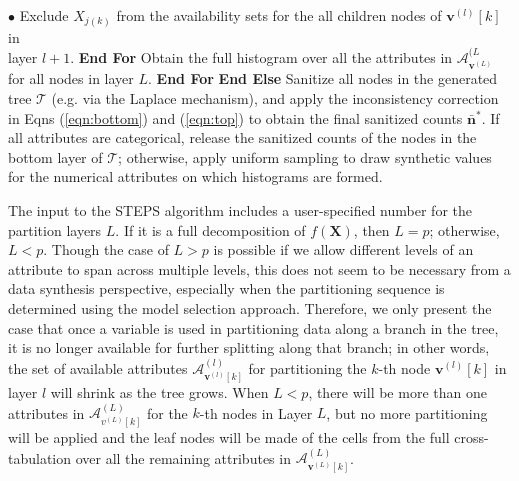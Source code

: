 \documentclass[12pt, A4]{article}
\newcommand{\vv}{\mathbf{v}}
\theoremstyle{plain}
\theoremstyle{exampstyle}\newtheorem{defn}{Definition}
\theoremstyle{exampstyle}\newtheorem{lem}{Lemma}
\theoremstyle{exampstyle}\newtheorem{cor}{Corollary}
\theoremstyle{exampstyle}\newtheorem{pro}{Proposition}
\theoremstyle{exampstyle}\newtheorem{cla}{Claim}
\theoremstyle{exampstyle}\newtheorem{rem}{Remark}
\begin{document}
\begin{algorithm}[!tbh]
\begin{algorithmic}[1]
\State \hspace{26 pt}$\bullet$ Exclude $X_{j(k)}$ from the availability sets for the all children nodes of $\vv^{(l)}[k]$ in \\  \hspace{30 pt} layer  $l+1$.
\State \hspace{20 pt} \textbf{End For}
\State \hspace{10 pt} Obtain the full histogram over all the attributes in $\mathcal{A}^{(L}_{\vv^{(L)}}$ for all nodes in layer $L$.
\State \hspace{10 pt} \textbf{End For}
\State \textbf{End Else}
\State  Sanitize all nodes in the generated tree $\mathcal{T}$ (e.g. via the Laplace mechanism), and apply the inconsistency correction in Eqns (\ref{eqn:bottom}) and (\ref{eqn:top}) to obtain the final sanitized counts $\bar{\mathbf{n}}^*$. 
\State  If all attributes are categorical, release the sanitized counts of the nodes in the bottom layer of $\mathcal{T}$; otherwise, apply  uniform sampling to draw synthetic values for the numerical attributes on which histograms are formed.
\end{algorithmic}
\end{algorithm}
The input to the STEPS algorithm includes a user-specified number for the partition layers $L$. If it is a full decomposition of $f(\mathbf{X})$, then $L=p$; otherwise, $L<p$. Though the case of $L>p$ is possible if we allow different levels of an attribute to span across multiple levels, this does not seem to be necessary from a data synthesis perspective, especially when the partitioning sequence is determined using the model selection approach. Therefore, we only present the case that once a variable is used in partitioning data along a branch in the tree, it is no longer available for further splitting along that branch; in other words, the set of available attributes $\mathcal{A}^{(l)}_{\vv^{(l)}[k]}$ for partitioning the $k$-th node  $\vv^{(l)}[k]$ in layer $l$ will shrink as the tree grows. When $L<p$, there  will be more than one attributes in $\mathcal{A}^{(L)}_{v^{(L)}[k]}$ for the $k$-th nodes in Layer $L$, but no more partitioning will be applied and the leaf nodes will be made of the cells from the full cross-tabulation over all the remaining attributes in $\mathcal{A}^{(L)}_{\vv^{(L)}[k]}$.
\end{document}
